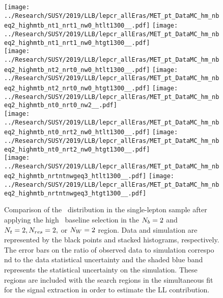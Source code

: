 \begin{figure}[!htb]
	\begin{center}
  \texttt{[image: ../Research/SUSY/2019/LLB/lepcr\_allEras/MET\_pt\_DataMC\_hm\_nbeq2\_highmtb\_nt1\_nrt1\_nw0\_htlt1300\_\_.pdf]}
  \texttt{[image: ../Research/SUSY/2019/LLB/lepcr\_allEras/MET\_pt\_DataMC\_hm\_nbeq2\_highmtb\_nt1\_nrt1\_nw0\_htgt1300\_\_.pdf]} \\
  \texttt{[image: ../Research/SUSY/2019/LLB/lepcr\_allEras/MET\_pt\_DataMC\_hm\_nbeq2\_highmtb\_nt2\_nrt0\_nw0\_htlt1300\_\_.pdf]}
  \texttt{[image: ../Research/SUSY/2019/LLB/lepcr\_allEras/MET\_pt\_DataMC\_hm\_nbeq2\_highmtb\_nt2\_nrt0\_nw0\_htgt1300\_\_.pdf]} 
  \texttt{[image: ../Research/SUSY/2019/LLB/lepcr\_allEras/MET\_pt\_DataMC\_hm\_nbeq2\_highmtb\_nt0\_nrt0\_nw2\_\_.pdf]} \\
  \texttt{[image: ../Research/SUSY/2019/LLB/lepcr\_allEras/MET\_pt\_DataMC\_hm\_nbeq2\_highmtb\_nt0\_nrt2\_nw0\_htlt1300\_\_.pdf]}  
  \texttt{[image: ../Research/SUSY/2019/LLB/lepcr\_allEras/MET\_pt\_DataMC\_hm\_nbeq2\_highmtb\_nt0\_nrt2\_nw0\_htgt1300\_\_.pdf]} \\
  \texttt{[image: ../Research/SUSY/2019/LLB/lepcr\_allEras/MET\_pt\_DataMC\_hm\_nbeq2\_highmtb\_nrtntnwgeq3\_htlt1300\_\_.pdf]} 
  \texttt{[image: ../Research/SUSY/2019/LLB/lepcr\_allEras/MET\_pt\_DataMC\_hm\_nbeq2\_highmtb\_nrtntnwgeq3\_htgt1300\_\_.pdf]} \\
	\end{center}
	\caption[Lost Lepton HM Control Region $\nb=2$ with 2 heavy objects]{Comparison of the \met~distribution in the single-lepton sample after applying the high \dm~baseline selection in the $\nb=2$ and $N_{t}=2, N_{res}=2,$ or $N_{W}=2$ region. Data and simulation are represented by the black points and stacked histograms, respectively. The error bars on the ratio of observed data to simulation correspo    nd to the data statistical uncertainty and the shaded blue band represents the statistical uncertainty on the simulation. These regions are included with the search regions in the simultaneous fit for the signal extraction in order to estimate the LL contribution.
	 }
	\label{fig:llb-1lcr-datavsmc-hm-nb2-2}
\end{figure}

